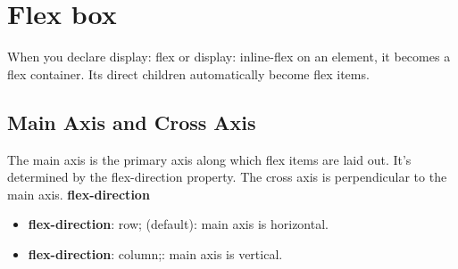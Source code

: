 \documentclass{report}
\begin{document}
    \pagebreak \bigbreak \noindent 
    \section{\LARGE Flex box}
    \bigbreak \noindent 
    When you declare display: flex or display: inline-flex on an element, it becomes a flex container. Its direct children automatically become flex items.

    \bigbreak \noindent 
    \subsection{Main Axis and Cross Axis}
    \bigbreak \noindent 
    The main axis is the primary axis along which flex items are laid out. It's determined by the flex-direction property. The cross axis is perpendicular to the main axis.
    \bigbreak \noindent 
    \textbf{flex-direction}
    \begin{itemize}
        \item \textbf{flex-direction}: row; (default): main axis is horizontal. 
        \item \textbf{flex-direction}: column;: main axis is vertical.
    \end{itemize}

    \bigbreak \noindent 
\end{document}

